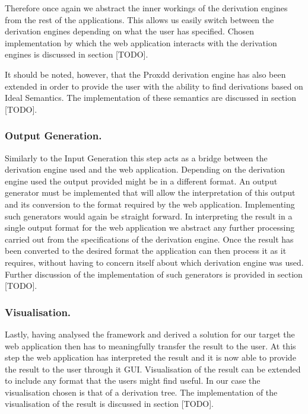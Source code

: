 Therefore once again we abstract the inner workings of the derivation engines from the rest of the applications. This allows us easily switch between the derivation engines depending on what the user has specified. Chosen implementation by which the web application interacts with the derivation engines is discussed in section [TODO].

It should be noted, however, that the Proxdd derivation engine has also been extended in order to provide the user with the ability to find derivations based on Ideal Semantics. The implementation of these semantics are discussed in section [TODO].

\subsubsection{Output Generation.}
Similarly to the Input Generation this step acts as a bridge between the derivation engine used and the web application. Depending on the derivation engine used the output provided might be in a different format. An output generator must be implemented that will allow the interpretation of this output and its conversion to the format required by the web application. Implementing such generators would again be straight forward. In interpreting the result in a single output format for the web application we abstract any further processing carried out from the specifications of the derivation engine. Once the result has been converted to the desired format the application can then process it as it requires, without having to concern itself about which derivation engine was used. Further discussion of the implementation of such generators is provided in section [TODO].

\subsubsection{Visualisation.}
Lastly, having analysed the framework and derived a solution for our target the web application then has to meaningfully transfer the result to the user. At this step the web application has interpreted the result and it is now able to provide the result to the user through it GUI. Visualisation of the result can be extended to include any format that the users might find useful. In our case the visualisation chosen is that of a derivation tree. The implementation of the visualisation of the result is discussed in section  [TODO].

